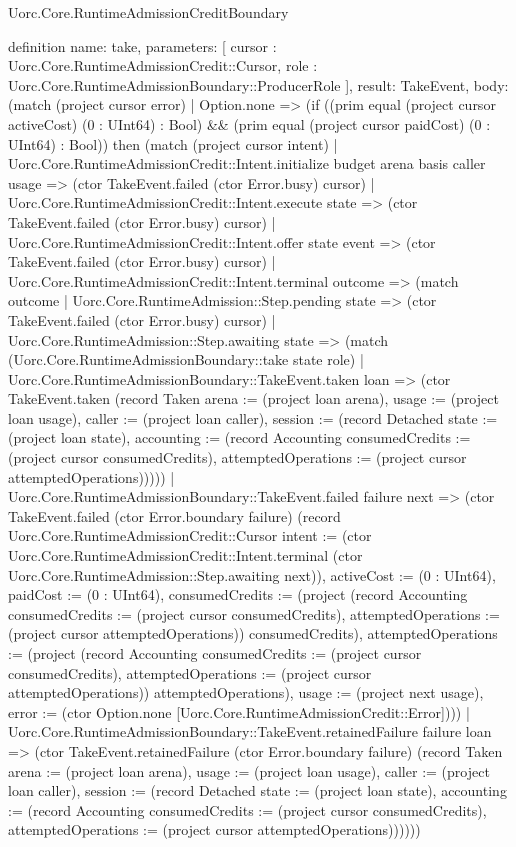 \begin{lexlean}{Uorc.Core.RuntimeAdmissionCreditBoundary}
\begin{semanticmodule}
definition{
  name: take,
  parameters: [
    cursor : Uorc.Core.RuntimeAdmissionCredit::Cursor,
    role : Uorc.Core.RuntimeAdmissionBoundary::ProducerRole
  ],
  result: TakeEvent,
  body: (match (project cursor error)
    | Option.none => (if ((prim equal (project cursor activeCost) (0 : UInt64) : Bool) && (prim equal (project cursor paidCost) (0 : UInt64) : Bool)) then (match (project cursor intent)
      | Uorc.Core.RuntimeAdmissionCredit::Intent.initialize budget arena basis caller usage => (ctor TakeEvent.failed (ctor Error.busy) cursor)
      | Uorc.Core.RuntimeAdmissionCredit::Intent.execute state => (ctor TakeEvent.failed (ctor Error.busy) cursor)
      | Uorc.Core.RuntimeAdmissionCredit::Intent.offer state event => (ctor TakeEvent.failed (ctor Error.busy) cursor)
      | Uorc.Core.RuntimeAdmissionCredit::Intent.terminal outcome => (match outcome
        | Uorc.Core.RuntimeAdmission::Step.pending state => (ctor TakeEvent.failed (ctor Error.busy) cursor)
        | Uorc.Core.RuntimeAdmission::Step.awaiting state => (match (Uorc.Core.RuntimeAdmissionBoundary::take state role)
          | Uorc.Core.RuntimeAdmissionBoundary::TakeEvent.taken loan => (ctor TakeEvent.taken (record Taken {arena := (project loan arena), usage := (project loan usage), caller := (project loan caller), session := (record Detached {state := (project loan state), accounting := (record Accounting {consumedCredits := (project cursor consumedCredits), attemptedOperations := (project cursor attemptedOperations)})})}))
          | Uorc.Core.RuntimeAdmissionBoundary::TakeEvent.failed failure next => (ctor TakeEvent.failed (ctor Error.boundary failure) (record Uorc.Core.RuntimeAdmissionCredit::Cursor {intent := (ctor Uorc.Core.RuntimeAdmissionCredit::Intent.terminal (ctor Uorc.Core.RuntimeAdmission::Step.awaiting next)), activeCost := (0 : UInt64), paidCost := (0 : UInt64), consumedCredits := (project (record Accounting {consumedCredits := (project cursor consumedCredits), attemptedOperations := (project cursor attemptedOperations)}) consumedCredits), attemptedOperations := (project (record Accounting {consumedCredits := (project cursor consumedCredits), attemptedOperations := (project cursor attemptedOperations)}) attemptedOperations), usage := (project next usage), error := (ctor Option.none [Uorc.Core.RuntimeAdmissionCredit::Error])}))
          | Uorc.Core.RuntimeAdmissionBoundary::TakeEvent.retainedFailure failure loan => (ctor TakeEvent.retainedFailure (ctor Error.boundary failure) (record Taken {arena := (project loan arena), usage := (project loan usage), caller := (project loan caller), session := (record Detached {state := (project loan state), accounting := (record Accounting {consumedCredits := (project cursor consumedCredits), attemptedOperations := (project cursor attemptedOperations)})})})))
}
\end{semanticmodule}
\end{lexlean}
